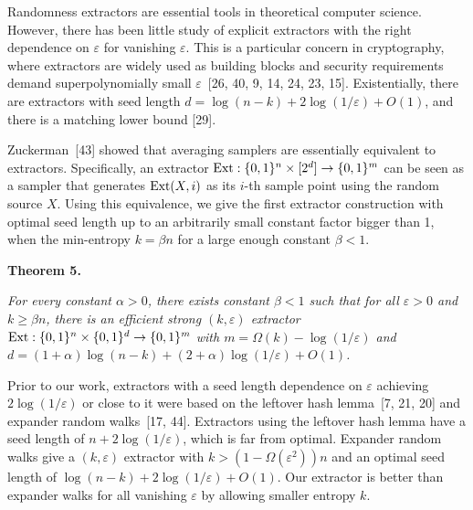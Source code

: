 \documentclass[10pt,a4paper]{article}
\begin{document}



Randomness extractors are essential tools in theoretical computer science. However, there has been little study of explicit extractors with the right dependence on $\varepsilon$ for vanishing $\varepsilon$.
This is a particular concern in cryptography, where extractors are widely used as building blocks and security requirements demand superpolynomially small $\varepsilon$ [26, 40, 9, 14, 24, 23, 15].
Existentially, there are extractors with seed length $d=\log(n-k)+2\log(1/\varepsilon)+O(1)$, and there is a matching lower bound [29].\par




Zuckerman [43] showed that averaging samplers are essentially equivalent to extractors. Specifically, an extractor $\textup{{Ext}}:\{0,1\}^{n}\times[2^{d}]\to\{0,1\}^{m}$ can be seen as a sampler that generates $\textup{{Ext}}(X,i)$ as its $i$-th sample point using the random source $X$. Using this equivalence, we give the first extractor construction with optimal seed length up to an arbitrarily small constant factor bigger than 1, when the min-entropy $k=\beta n$ for a large enough constant $\beta<1$.\par





\par\medskip\noindent\textbf{
\textbf{Theorem 5}\textbf{.}
}\par



\emph{For every constant $\alpha>0$, there exists constant $\beta<1$ such that for all $\varepsilon>0$ and $k\geq\beta n$, there is an efficient strong $(k,\varepsilon)$ extractor $\textup{{Ext}}:\{0,1\}^{n}\times\{0,1\}^{d}\to\{0,1\}^{m}$ with $m=\Omega(k)-\log(1/\varepsilon)$ and $d=(1+\alpha)\log(n-k)+(2+\alpha)\log(1/\varepsilon)+O(1)$.}\par






Prior to our work, extractors with a seed length dependence on $\varepsilon$ achieving $2\log(1/\varepsilon)$ or close to it were based on the leftover hash lemma [7, 21, 20] and expander random walks [17, 44]. Extractors using the leftover hash lemma have a seed length of $n+2\log(1/\varepsilon)$, which is far from optimal. Expander random walks give a $(k,\varepsilon)$ extractor with $k>(1-\Omega(\varepsilon^{2}))n$ and an optimal seed length of $\log(n-k)+2\log(1/\varepsilon)+O(1)$. Our extractor is better than expander walks for all vanishing $\varepsilon$ by allowing smaller entropy $k$.\par
\end{document}
